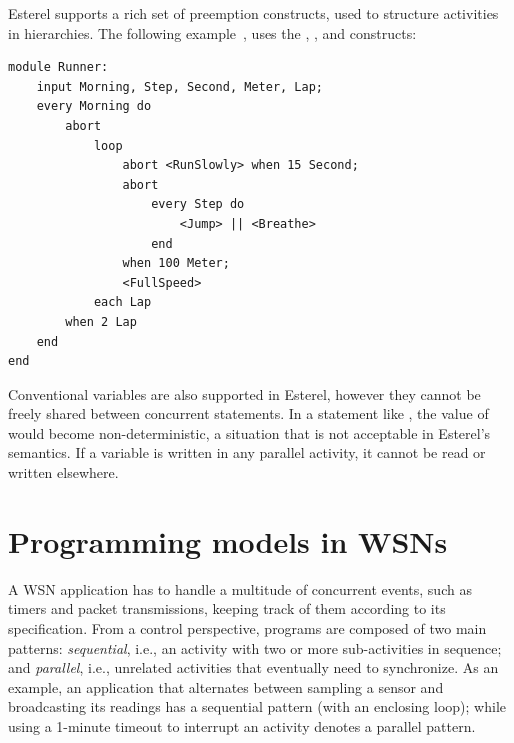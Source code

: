 
Esterel supports a rich set of preemption constructs, used to structure 
activities in hierarchies.
The following example~\cite{esterel.foundations}, uses the , 
, and  constructs:

\begin{lstlisting}
module Runner:
    input Morning, Step, Second, Meter, Lap;
    every Morning do
        abort
            loop
                abort <RunSlowly> when 15 Second;
                abort
                    every Step do
                        <Jump> || <Breathe>
                    end
                when 100 Meter;
                <FullSpeed>
            each Lap
        when 2 Lap
    end
end
\end{lstlisting}


Conventional variables are also supported in Esterel, however they cannot be 
freely shared between concurrent statements.
In a statement like \code{[~v~:=~1~||~v~:=~2~]}, the value of  would 
become non-deterministic, a situation that is not acceptable in Esterel's 
semantics.
If a variable is written in any parallel activity, it cannot be read or written 
elsewhere.

\section{Programming models in WSNs}
\label{sec.ceu.overview}

A WSN application has to handle a multitude of concurrent events, such as 
timers and packet transmissions, keeping track of them according to its 
specification.
%
From a control perspective, programs are composed of two main patterns: 
\emph{sequential}, i.e., an activity with two or more sub-activities in 
sequence;
and \emph{parallel}, i.e., unrelated activities that eventually need to 
synchronize.
%
As an example, an application that alternates between sampling a sensor and 
broadcasting its readings has a sequential pattern (with an enclosing loop); 
while using a 1-minute timeout to interrupt an activity denotes a parallel 
pattern.

